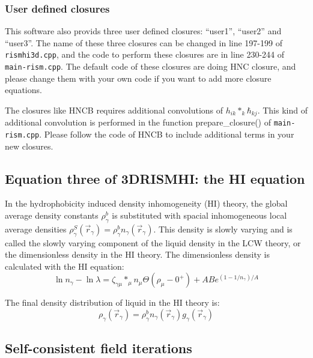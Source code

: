 \documentclass[aip,amsmath,amssymb,reprint,onecolumn]{revtex4-1}
\begin{document}
\subsubsection{User defined closures}

{\it

This software also provids three user defined closures: ``user1'', ``user2'' and ``user3''. The name of these three closures can be changed in line 197-199 of \texttt{rismhi3d.cpp}, and the code to perform these closures are in line 230-244 of \texttt{main-rism.cpp}. The default code of these closures are doing HNC closure, and please change them with your own code if you want to add more closure equations.

The closures like HNCB requires additional convolutions of $h_{ik}*_k\hbar_{kj}$. This kind of additional convolution is performed in the function prepare\_closure() of \texttt{main-rism.cpp}. Please follow the code of HNCB to include additional terms in your new closures.

}

\subsection{Equation three of 3DRISMHI: the HI equation}

In the hydrophobicity induced density inhomogeneity (HI) theory, the global average density constants $\rho^b_\gamma$ is substituted with spacial inhomogeneous local average densities $\rho^S_\gamma(\vec{r}_\gamma) = \rho^b_\gamma n_\gamma(\vec{r}_\gamma)$. This density is slowly varying and is called the slowly varying component of the liquid density in the LCW theory, or the dimensionless density in the HI theory. The dimensionless density is calculated with the HI equation:
\begin{equation}
    \ln n_\gamma - \ln\lambda = \zeta_{\gamma\mu}*_\mu n_\mu\Theta(\rho_\mu-0^+) + ABe^{(1-1/n_\gamma)/A}
\end{equation}

The final density distribution of liquid in the HI theory is:
\begin{equation}
    \rho_\gamma(\vec{r}_\gamma) = \rho^b_\gamma n_\gamma(\vec{r}_\gamma) g_\gamma(\vec{r}_\gamma)
\end{equation}

\subsection{Self-consistent field iterations}
\end{document}
